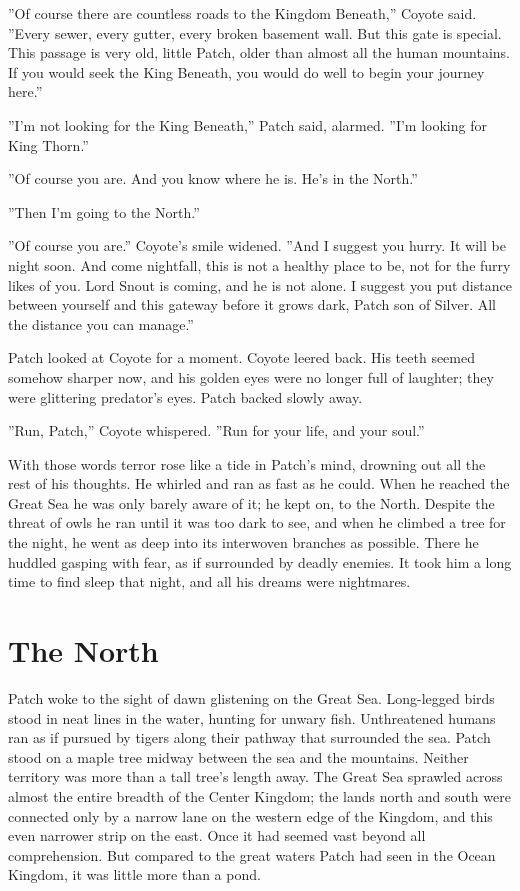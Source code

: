\documentclass[12pt]{book}
\begin{document}
''Of course there are countless roads to the Kingdom Beneath,'' Coyote said. ''Every sewer, every gutter, every broken basement wall. But this gate is special. This passage is very old, little Patch, older than almost all the human mountains. If you would seek the King Beneath, you would do well to begin your journey here.''

''I'm not looking for the King Beneath,'' Patch said, alarmed. ''I'm looking for King Thorn.''

''Of course you are. And you know where he is. He's in the North.''

''Then I'm going to the North.''

''Of course you are.'' Coyote's smile widened. ''And I suggest you hurry. It will be night soon. And come nightfall, this is not a healthy place to be, not for the furry likes of you. Lord Snout is coming, and he is not alone. I suggest you put distance between yourself and this gateway before it grows dark, Patch son of Silver. All the distance you can manage.''

Patch looked at Coyote for a moment. Coyote leered back. His teeth seemed somehow sharper now, and his golden eyes were no longer full of laughter; they were glittering predator's eyes. Patch backed slowly away.

''Run, Patch,'' Coyote whispered. ''Run for your life, and your soul.''

With those words terror rose like a tide in Patch's mind, drowning out all the rest of his thoughts. He whirled and ran as fast as he could. When he reached the Great Sea he was only barely aware of it; he kept on, to the North. Despite the threat of owls he ran until it was too dark to see, and when he climbed a tree for the night, he went as deep into its interwoven branches as possible. There he huddled gasping with fear, as if surrounded by deadly enemies. It took him a long time to find sleep that night, and all his dreams were nightmares.


\section{The North}

Patch woke to the sight of dawn glistening on the Great Sea. Long-legged birds stood in neat lines in the water, hunting for unwary fish. Unthreatened humans ran as if pursued by tigers along their pathway that surrounded the sea. Patch stood on a maple tree midway between the sea and the mountains. Neither territory was more than a tall tree's length away. The Great Sea sprawled across almost the entire breadth of the Center Kingdom; the lands north and south were connected only by a narrow lane on the western edge of the Kingdom, and this even narrower strip on the east. Once it had seemed vast beyond all comprehension. But compared to the great waters Patch had seen in the Ocean Kingdom, it was little more than a pond.
\end{document}
